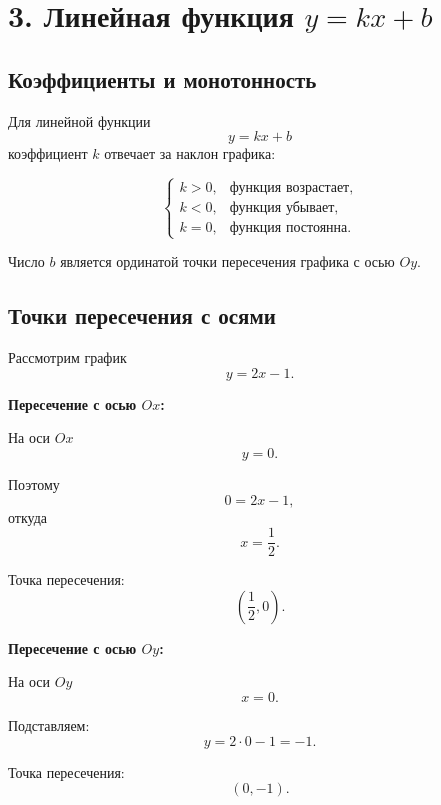 \documentclass[a4paper,12pt]{article}
\newcommand{\sect}[1]{\section*{\textcolor{darkaccent}{#1}}}
\newcommand{\subsect}[1]{\subsection*{\textcolor{accent}{#1}}}
\newcommand{\key}[1]{\textbf{\textcolor{darkaccent}{#1}}}
\begin{document}
\clearpage

\sect{3. Линейная функция $y=kx+b$}

\subsect{Коэффициенты и монотонность}

Для линейной функции
\[
y=kx+b
\]
коэффициент $k$ отвечает за наклон графика:

\[
\begin{cases}
k>0, & \text{функция возрастает},\\
k<0, & \text{функция убывает},\\
k=0, & \text{функция постоянна}.
\end{cases}
\]

Число $b$ является ординатой точки пересечения графика с осью $Oy$.

\subsect{Точки пересечения с осями}

Рассмотрим график
\[
y=2x-1.
\]

\key{Пересечение с осью $Ox$:}

На оси $Ox$
\[
y=0.
\]

Поэтому
\[
0=2x-1,
\]
откуда
\[
x=\frac12.
\]

Точка пересечения:
\[
\left(\frac12,0\right).
\]

\key{Пересечение с осью $Oy$:}

На оси $Oy$
\[
x=0.
\]

Подставляем:
\[
y=2\cdot0-1=-1.
\]

Точка пересечения:
\[
(0,-1).
\]

\begin{center}
\end{center}
\end{document}
